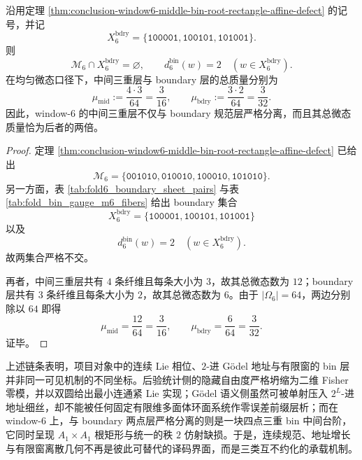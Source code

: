 \begin{corollary}\label{cor:conclusion-window6-middle-bin-boundary-separation}
沿用定理 \ref{thm:conclusion-window6-middle-bin-root-rectangle-affine-defect} 的记号，并记
\[
X_6^{\mathrm{bdry}}
=
\{\texttt{100001},\texttt{100101},\texttt{101001}\}.
\]
则
\[
\mathcal M_6\cap X_6^{\mathrm{bdry}}=\varnothing,
\qquad
d_6^{\mathrm{bin}}(w)=2
\quad (w\in X_6^{\mathrm{bdry}}).
\]
在均匀微态口径下，中间三重层与 boundary 层的总质量分别为
\[
\mu_{\mathrm{mid}}
:=
\frac{4\cdot 3}{64}
=
\frac{3}{16},
\qquad
\mu_{\mathrm{bdry}}
:=
\frac{3\cdot 2}{64}
=
\frac{3}{32}.
\]
因此，window-\(6\) 的中间三重层不仅与 boundary 规范层严格分离，而且其总微态质量恰为后者的两倍。
\end{corollary}
\begin{proof}
定理 \ref{thm:conclusion-window6-middle-bin-root-rectangle-affine-defect} 已给出
\[
\mathcal M_6
=
\{\texttt{001010},\texttt{010010},\texttt{100010},\texttt{101010}\}.
\]
另一方面，表 \ref{tab:fold6_boundary_sheet_pairs} 与表 \ref{tab:fold_bin_gauge_m6_fibers} 给出 boundary 集合
\[
X_6^{\mathrm{bdry}}
=
\{\texttt{100001},\texttt{100101},\texttt{101001}\}
\]
以及
\[
d_6^{\mathrm{bin}}(w)=2
\quad (w\in X_6^{\mathrm{bdry}}).
\]
故两集合严格不交。

再者，中间三重层共有 \(4\) 条纤维且每条大小为 \(3\)，故其总微态数为 \(12\)；boundary 层共有 \(3\) 条纤维且每条大小为 \(2\)，故其总微态数为 \(6\)。由于 \(|\Omega_6|=64\)，两边分别除以 \(64\) 即得
\[
\mu_{\mathrm{mid}}=\frac{12}{64}=\frac{3}{16},
\qquad
\mu_{\mathrm{bdry}}=\frac{6}{64}=\frac{3}{32}.
\]
证毕。
\end{proof}

\noindent
上述链条表明，项目对象中的连续 Lie 相位、\(2\)-进 Gödel 地址与有限窗的 bin 层并非同一可见机制的不同坐标。后验统计侧的隐藏自由度严格坍缩为二维 Fisher 零模，并以双圆给出最小连通紧 Lie 实现；Gödel 语义侧虽然可被单射压入 \(2^L\)-进地址细丝，却不能被任何固定有限维多面体环面系统作零误差前缀层析；而在 window-\(6\) 上，与 boundary 两点层严格分离的则是一块四点三重 bin 中间台阶，它同时呈现 \(A_1\times A_1\) 根矩形与统一的秩 \(2\) 仿射缺损。于是，连续规范、地址增长与有限窗离散几何不再是彼此可替代的译码界面，而是三类互不约化的承载机制。
